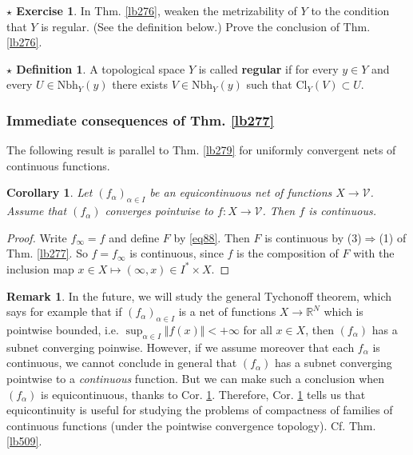 \documentclass[12pt,b5paper,notitlepage]{article}
\theoremstyle{definition}
\newtheorem{rem}[df]{Remark}
\newtheorem{sexe}[df]{$\star$ Exercise}
\newtheorem{sdf}[df]{$\star$ Definition}
\theoremstyle{plain}
\newtheorem{co}[df]{Corollary}
\newcommand{\mc}{\mathcal}
\newcommand{\Rbb}{\mathbb R}
\newcommand{\Nbh}{\mathrm{Nbh}}
\newcommand{\Cl}{\mathrm{Cl}}
\numberwithin{equation}{section}
\begin{document}
\begin{sexe}
In Thm. \ref{lb276}, weaken the metrizability of $Y$ to the condition that $Y$ is regular. (See the definition below.) Prove the conclusion of Thm. \ref{lb276}.
\end{sexe}

\begin{sdf}\label{lb504}
A topological space $Y$ is called \textbf{regular}  if for every $y\in Y$ and every $U\in\Nbh_Y(y)$ there exists $V\in\Nbh_Y(y)$ such that $\Cl_Y(V)\subset U$.
\end{sdf}









\subsubsection{Immediate consequences of Thm. \ref{lb277}}

The following result is parallel to Thm. \ref{lb279} for uniformly convergent nets of continuous functions.

\begin{co}\label{lb303}
Let $(f_\alpha)_{\alpha\in I}$ be an equicontinuous net of functions $X\rightarrow\mc V$. Assume that $(f_\alpha)$ converges pointwise to $f:X\rightarrow\mc V$. Then $f$ is continuous.
\end{co}

\begin{proof}
Write $f_\infty=f$ and define $F$ by \eqref{eq88}. Then $F$ is continuous by (3)$\Rightarrow$(1) of Thm. \ref{lb277}. So $f=f_\infty$ is continuous, since $f$ is the composition of $F$ with the inclusion map $x\in X\mapsto (\infty,x)\in I^*\times X$.
\end{proof}






\begin{rem}\label{lb304}
In the future, we will study the general Tychonoff theorem, which says for example that if $(f_\alpha)_{\alpha\in I}$ is a net of functions $X\rightarrow\Rbb^N$ which is pointwise bounded, i.e. $\sup_{\alpha\in I}\Vert f(x)\Vert<+\infty$ for all $x\in X$, then $(f_\alpha)$ has a subnet converging poinwise. However, if we assume moreover that each $f_\alpha$ is continuous, we cannot conclude in general that $(f_\alpha)$ has a subnet converging pointwise to a \textit{continuous} function. But we can make such a conclusion when $(f_\alpha)$ is equicontinuous, thanks to Cor. \ref{lb303}. Therefore, Cor. \ref{lb303} tells us that equicontinuity is useful for studying the problems of compactness of families of continuous functions (under the pointwise convergence topology). Cf. Thm. \ref{lb509}.
\end{rem}
\end{document}
